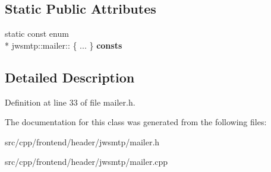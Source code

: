 \subsection*{Static Public Attributes}
\begin{DoxyCompactItemize}
\item 
\hypertarget{classjwsmtp_1_1mailer_abdf7408f0f12643fa0591ea90ebd151f}{static const enum \\*
jwsmtp\-::mailer\-:: \{ ... \}  {\bfseries consts}}\label{classjwsmtp_1_1mailer_abdf7408f0f12643fa0591ea90ebd151f}

\end{DoxyCompactItemize}


\subsection{Detailed Description}


Definition at line 33 of file mailer.\-h.



The documentation for this class was generated from the following files\-:\begin{DoxyCompactItemize}
\item 
src/cpp/frontend/header/jwsmtp/mailer.\-h\item 
src/cpp/frontend/header/jwsmtp/mailer.\-cpp\end{DoxyCompactItemize}
